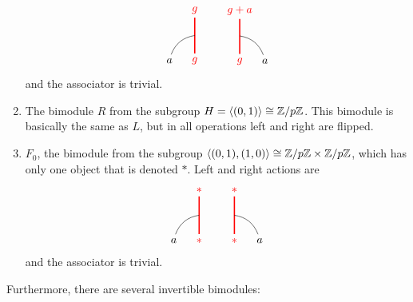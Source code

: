 \begin{enumerate}
			\begin{equation}
				\begin{tikzpicture}[scale=0.8,baseline=(current bounding box.center)]
				\node[red](m) at (0,0) {$g$};
				\node(b) at (-1,0) {$a$};
				\node[red](abm) at (0,2) {$g$};
				\draw[red,line width=0.4mm] (m)-- (abm);
				\draw (b) to [bend left] (0,1);
				\end{tikzpicture}\hspace{20pt}
				\begin{tikzpicture}[scale=0.8,baseline=(current bounding box.center)]
				\node[red](m) at (0,0) {$g$};
				\node(b) at (1,0) {$a$};
				\node[red](abm) at (0,2) {$g+a$};
				\draw[red,line width=0.4mm] (m)-- (abm);
				\draw (b) to [bend right] (0,1);
				\end{tikzpicture}
			\end{equation}
		and the associator is trivial.
		\item The bimodule $R$ from the subgroup $H=\langle(0,1)\rangle\cong \mathbb{Z}/p\mathbb{Z}$. This bimodule is basically the same as $L$, but in all operations left and right are flipped.
		\item $F_0$, the bimodule from the subgroup $\langle(0,1),(1,0)\rangle\cong\mathbb{Z}/p\mathbb{Z}\times\mathbb{Z}/p\mathbb{Z}$, which has only one object that is denoted $*$. Left and right actions are
			\begin{equation}
				\begin{tikzpicture}[scale=0.8,baseline=(current bounding box.center)]
				\node[red](m) at (0,0) {$*$};
				\node(b) at (-1,0) {$a$};
				\node[red](abm) at (0,2) {$*$};
				\draw[red,line width=0.4mm] (m)-- (abm);
				\draw (b) to [bend left] (0,1);
				\end{tikzpicture}\hspace{20pt}
				\begin{tikzpicture}[scale=0.8,baseline=(current bounding box.center)]
				\node[red](m) at (0,0) {$*$};
				\node(b) at (1,0) {$a$};
				\node[red](abm) at (0,2) {$*$};
				\draw[red,line width=0.4mm] (m)-- (abm);
				\draw (b) to [bend right] (0,1);
				\end{tikzpicture}
			\end{equation}
		\noindent
		and the associator is trivial.
	\end{enumerate}
Furthermore, there are several invertible bimodules:
